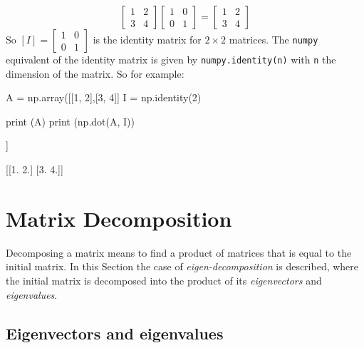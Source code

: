 \begin{equation*}
\begin{bmatrix}
1 & 2 \\
3 & 4
\end{bmatrix}
\begin{bmatrix}
1 & 0 \\
0 & 1
\end{bmatrix}
=
\begin{bmatrix}
1 & 2 \\
3 & 4
\end{bmatrix}
\end{equation*}
So $[I] = 
\begin{bmatrix}
1 & 0 \\
0 & 1
\end{bmatrix}
$ is the identity matrix for $2\times 2$ matrices. The \texttt{numpy} equivalent of the identity matrix is given by
\texttt{numpy.identity(n)} with \texttt{n} the dimension of the matrix. So for example:

\begin{ipython}
A = np.array([[1, 2],[3, 4]]
I = np.identity(2)	

print (A)
print (np.dot(A, I))
\end{ipython}
\begin{ioutput}
[[1 2]
 [3 4]]

[[1. 2.]
 [3. 4.]]
\end{ioutput}
    
\section{Matrix Decomposition}
\label{eigendecomposition}

Decomposing a matrix means to find a product of matrices that is equal to the initial matrix. In this Section the case of \emph{eigen-decomposition} is described, where the initial matrix is decomposed into the product of its \emph{eigenvectors} and \emph{eigenvalues}.

\subsection{Eigenvectors and eigenvalues}
\label{eigenvectors-and-eigenvalues}


